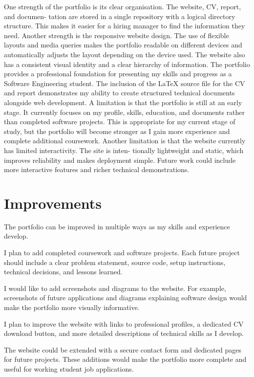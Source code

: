 \documentclass[12pt, a4paper]{article}
\begin{document}
One strength of the portfolio is its clear organisation. The website, CV, report, and documen-
tation are stored in a single repository with a logical directory structure. This makes it easier
for a hiring manager to find the information they need.
Another strength is the responsive website design. The use of flexible layouts and media
queries makes the portfolio readable on different devices and automatically adjusts the layout
depending on the device used. The website also has a consistent visual identity and a clear
hierarchy of information.
The portfolio provides a professional foundation for presenting my skills and progress as a
Software Engineering student. The inclusion of the LaTeX source file for the CV and report
demonstrates my ability to create structured technical documents alongside web development.
A limitation is that the portfolio is still at an early stage. It currently focuses on my profile,
skills, education, and documents rather than completed software projects. This is appropriate for my current stage of study, but the portfolio will become stronger as I gain more experience
and complete additional coursework.
Another limitation is that the website currently has limited interactivity. The site is inten-
tionally lightweight and static, which improves reliability and makes deployment simple. Future
work could include more interactive features and richer technical demonstrations.

\section{Improvements}

The portfolio can be improved in multiple ways as my skills and experience
develop.

I plan to add completed coursework and software projects. Each future project
should include a clear problem statement, source code, setup instructions,
technical decisions, and lessons learned.

I would like to add screenshots and diagrams to the website. For example,
screenshots of future applications and diagrams explaining software design
would make the portfolio more visually informative.

I plan to improve the website with links to professional profiles, a dedicated
CV download button, and more detailed descriptions of technical skills as I
develop.

The website could be extended with a secure contact form and dedicated pages
for future projects. These additions would make the portfolio more complete
and useful for working student job applications.
\end{document}
